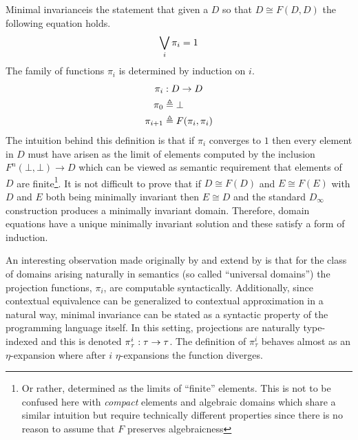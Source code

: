 Minimal invarianceis the statement that given a $D$ so
that $D \cong F(D, D)$ the following equation holds.
\[
  \bigvee_i \pi_i = 1
\]
The family of functions $\pi_i$ is determined by induction on $i$.
\begin{align*}
  \pi_i &: D \to D\\
  \pi_0 &\mathrel{\triangleq} \bot\\
  \pi_{i + 1} &\mathrel{\triangleq} F(\pi_i, \pi_i)
\end{align*}
The intuition behind this definition is that if $\pi_i$ converges to
$1$ then every element in $D$ must have arisen as the limit of
elements computed by the inclusion $F^n(\bot, \bot) \to D$ which can
be viewed as semantic requirement that elements of $D$ are
finite\footnote{Or rather, determined as the limits of ``finite''
  elements. This is not to be confused here with \emph{compact} elements and
  algebraic domains which share a similar intuition but require
  technically different properties since there is no reason to assume
  that $F$ preserves algebraicness}. It is not difficult to prove that
if $D \cong F(D)$ and $E \cong F(E)$ with $D$ and $E$ both being
minimally invariant then $E \cong D$ and the standard $D_\infty$
construction produces a minimally invariant domain. Therefore, domain
equations have a unique minimally invariant solution and these satisfy
a form of induction.

An interesting observation made originally by
\citet{Birkedal:99} and extend by
\citet{Crary:07} is that for the class of domains arising
naturally in semantics (so called ``universal domains'') the
projection functions, $\pi_i$, are computable
syntactically. Additionally, since contextual equivalence can be
generalized to contextual approximation in a natural way, minimal
invariance can be stated as a syntactic property of the programming
language itself. In this setting, projections are naturally
type-indexed and this is denoted $\pi_\tau^i : \tau \to \tau$. The
definition of $\pi_\tau^i$ behaves almost as an $\eta$-expansion where
after $i$ $\eta$-expansions the function diverges.

